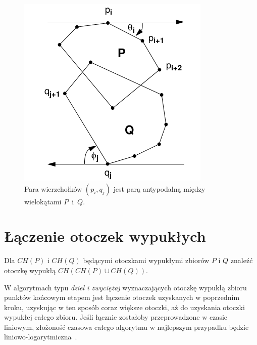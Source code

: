 \begin{figure}[tb]
  \centering
  \includegraphics[scale=0.5]{img/calipers3}
  \caption{\label{img:calipers3} Para wierzchołków $(p_i, q_j)$ jest
    parą antypodalną między wielokątami $P$~i~$Q$.}
\end{figure}

\section{Łączenie otoczek wypukłych}
\begin{problem}
  Dla $CH(P)$ i $CH(Q)$ będącymi otoczkami wypukłymi zbiorów $P$ i
  $Q$ znaleźć otoczkę wypukłą $CH(CH(P) \cup CH(Q))$.
\end{problem}

W algorytmach typu \emph{dziel i zwyciężaj} wyznaczających otoczkę
wypukłą zbioru punktów końcowym etapem jest łączenie otoczek
uzyskanych w poprzednim kroku, uzyskując w ten sposób coraz większe
otoczki, aż do uzyskania otoczki wypukłej całego zbioru. Jeśli łącznie
zostałoby przeprowadzone w czasie liniowym, złożoność czasowa całego
algorytmu w najlepszym przypadku będzie
liniowo-logarytmiczna~\cite{Graham72}.

